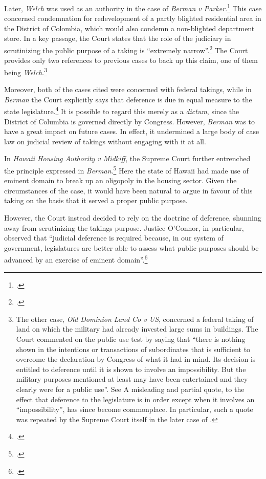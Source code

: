 Later, {\it Welch} was used as an authority in the case of {\it Berman v Parker}.\footcite{berman54} This case concerned condemnation for redevelopment of a partly blighted residential area in the District of Colombia, which would also condemn a non-blighted department store. In a key passage, the Court states that the role of the judiciary in scrutinizing the public purpose of a taking is ``extremely narrow''.\footcite[32]{berman54} The Court provides only two references to previous cases to back up this claim, one of them being {\it Welch}.\footnote{The other case, {\it Old Dominion Land Co v US}, concerned a federal taking of land on which the military had already invested large sums in buildings. The Court commented on the public use test by saying that ``there is nothing shown in the intentions or transactions of subordinates that is sufficient to overcome the declaration by Congress of what it had in mind. Its decision is entitled to deference until it is shown to involve an impossibility. But the military purposes mentioned at least may have been entertained and they clearly were for a public use''. See \cite[66]{dominion25} A misleading and partial quote, to the effect that deference to the legislature is in order except when it involves an ``impossibility'', has since become commonplace. In particular, such a quote was repeated by the Supreme Court itself in the later case of \cite[240]{midkiff84}.}

Moreover, both of the cases cited were concerned with federal takings, while in {\it Berman} the Court explicitly says that deference is due in equal measure to the state legislature.\footcite[32]{berman54} It is possible to regard this merely as a {\it dictum}, since the District of Columbia is governed directly by Congress. However, {\it Berman} was to have a great impact on future cases. In effect, it undermined a large body of case law on judicial review of takings without engaging with it at all.

In {\it Hawaii Housing Authority v Midkiff}, the Supreme Court further entrenched the principle expressed in {\it Berman}.\footcite{midkiff84} Here the state of Hawaii had made use of eminent domain  to break up an oligopoly in the housing sector. Given the circumstances of the case, it would have been natural to argue in favour of this taking on the basis that it served a proper public purpose.

However, the Court instead decided to rely on the doctrine of deference, shunning away from scrutinizing the takings purpose. Justice O'Connor, in particular, observed that ``judicial deference is required because, in our system of government, legislatures are better able to assess what public purposes should be advanced by an exercise of eminent domain''.\footcite[244]{midkiff84}

